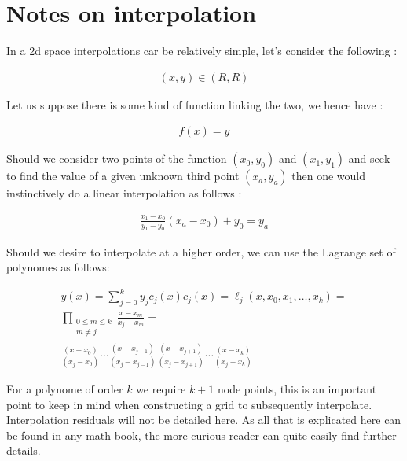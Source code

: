 \appendix

\section{Notes on interpolation}

In a 2d space interpolations car be relatively simple, let's consider the following :

\begin{align} 
    (x,y) \in (R,R)
\end{align}

Let us suppose there is some kind of function linking the two, we hence have :

\begin{align} 
    f(x) = y
\end{align}

Should we consider two points of the function $(x_0,y_0)$ and $(x_1,y_1)$ and seek to find the value of a given unknown third point $(x_a,y_a)$ then one would instinctively do a linear interpolation as follows :

\begin{align} 
    \frac{x_1-x_0}{y_1-y_0} (x_a-x_0) + y_0 = y_a
    \label{eq:interp1d}
\end{align}

Should we desire to interpolate at a higher order, we can use the Lagrange set of polynomes as follows:

\begin{align} 
    y(x) = \sum_{j=0}^{k} y_j c_j(x)
        c_j(x) = \ell_j(x,x_0,x_1,\ldots,x_k) = \nonumber \\
        \prod_{\begin{smallmatrix}0\le m\le k\\ m\neq j\end{smallmatrix}} \frac{x-x_m}{x_j-x_m} = \nonumber \\
        \frac{(x-x_0)}{(x_j-x_0)} \cdots \frac{(x-x_{j-1})}{(x_j-x_{j-1})} \frac{(x-x_{j+1})}{(x_j-x_{j+1})} \cdots \frac{(x-x_k)}{(x_j-x_k)}
\end{align}

For a polynome of order $k$ we require $k+1$ node points, this is an important point to keep in mind when constructing a grid to subsequently interpolate. Interpolation residuals will not be detailed here. As all that is explicated here can be found in any math book, the more curious reader can quite easily find further details.

